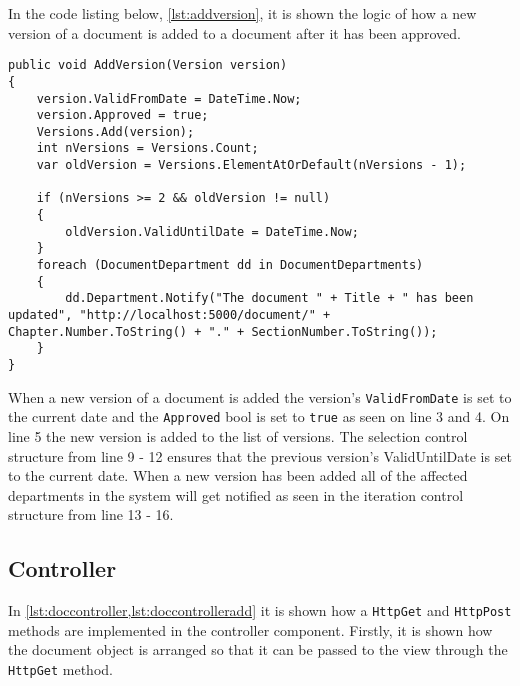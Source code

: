 In the code listing below, \cref{lst:addversion}, it is shown the logic of how a new version of a document is added to a document after it has been approved.
\\

\begin{lstlisting}[caption={Document Model: AddVersion}, label={lst:addversion}]
public void AddVersion(Version version)
{
	version.ValidFromDate = DateTime.Now;
	version.Approved = true;
	Versions.Add(version);
	int nVersions = Versions.Count;
	var oldVersion = Versions.ElementAtOrDefault(nVersions - 1);

	if (nVersions >= 2 && oldVersion != null)
	{
		oldVersion.ValidUntilDate = DateTime.Now;
	}
	foreach (DocumentDepartment dd in DocumentDepartments)
	{
		dd.Department.Notify("The document " + Title + " has been updated", "http://localhost:5000/document/" + Chapter.Number.ToString() + "." + SectionNumber.ToString());
	}
}
\end{lstlisting}

When a new version of a document is added the version's \texttt{ValidFromDate} is set to the current date and the \texttt{Approved} bool is set to \texttt{true} as seen on line 3 and 4.
On line 5 the new version is added to the list of versions.
The selection control structure from line 9 - 12 ensures that the previous version's ValidUntilDate is set to the current date.
When a new version has been added all of the affected departments in the system will get notified as seen in the iteration control structure from line 13 - 16.

\subsection{Controller}

In \cref{lst:doccontroller,lst:doccontrolleradd} it is shown how a \texttt{HttpGet} and \texttt{HttpPost} methods are implemented in the controller component.
Firstly, it is shown how the document object is arranged so that it can be passed to the view through the \texttt{HttpGet} method.
\\

